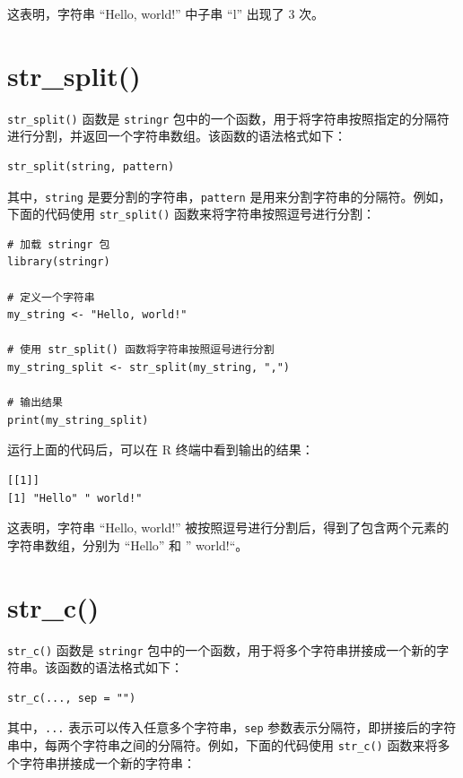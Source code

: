 \documentclass[
  letterpaper,
  DIV=11,
  numbers=noendperiod]{scrreprt}
\begin{document}
这表明，字符串 ``Hello, world!'' 中子串 ``l'' 出现了 3 次。

\hypertarget{str_split}{%
\section{str\_split()}\label{str_split}}

\texttt{str\_split()} 函数是 \texttt{stringr}
包中的一个函数，用于将字符串按照指定的分隔符进行分割，并返回一个字符串数组。该函数的语法格式如下：

\begin{verbatim}
str_split(string, pattern)
\end{verbatim}

其中，\texttt{string} 是要分割的字符串，\texttt{pattern}
是用来分割字符串的分隔符。例如，下面的代码使用 \texttt{str\_split()}
函数来将字符串按照逗号进行分割：

\begin{verbatim}
# 加载 stringr 包
library(stringr)

# 定义一个字符串
my_string <- "Hello, world!"

# 使用 str_split() 函数将字符串按照逗号进行分割
my_string_split <- str_split(my_string, ",")

# 输出结果
print(my_string_split)
\end{verbatim}

运行上面的代码后，可以在 R 终端中看到输出的结果：

\begin{verbatim}
[[1]]
[1] "Hello" " world!"
\end{verbatim}

这表明，字符串 ``Hello, world!''
被按照逗号进行分割后，得到了包含两个元素的字符串数组，分别为 ``Hello''
和 '' world!{}``。

\hypertarget{str_c}{%
\section{str\_c()}\label{str_c}}

\texttt{str\_c()} 函数是 \texttt{stringr}
包中的一个函数，用于将多个字符串拼接成一个新的字符串。该函数的语法格式如下：

\begin{verbatim}
str_c(..., sep = "")
\end{verbatim}

其中，\texttt{...} 表示可以传入任意多个字符串，\texttt{sep}
参数表示分隔符，即拼接后的字符串中，每两个字符串之间的分隔符。例如，下面的代码使用
\texttt{str\_c()} 函数来将多个字符串拼接成一个新的字符串：
\end{document}
